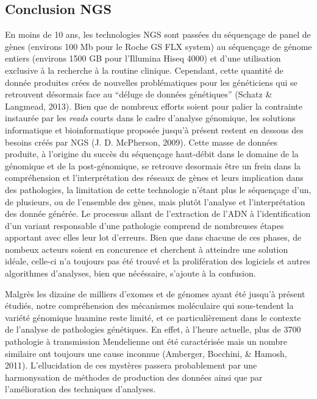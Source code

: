 \documentclass[12pt,twoside]{reedthesis}
\theoremstyle{definition}
\theoremstyle{definition}
\theoremstyle{remark}
\begin{document}
  \subsection{Conclusion NGS}\label{conclusion-ngs}
  
  En moins de 10 ans, les technologies NGS sont passées du séquençage de
  panel de gènes (environs 100 Mb pour le Roche GS FLX system) au
  séquençage de génome entiers (environs 1500 GB pour l'Illumina Hiseq
  4000) et d'une utilisation exclusive à la recherche à la routine
  clinique. Cependant, cette quantité de donnée produites crées de
  nouvelles problématiques pour les généticiens qui se retrouvent
  désormais face au ``déluge de données génétiques'' (Schatz \& Langmead,
  2013). Bien que de nombreux efforts soient pour palier la contrainte
  instaurée par les \emph{reads} courts dans le cadre d'analyse génomique,
  les solutions informatique et bioinformatique proposée jusqu'à présent
  restent en dessous des besoins créés par NGS (J. D. McPherson, 2009).
  Cette masse de données produite, à l'origine du succès du séquençage
  haut-débit dans le domaine de la génomique et de la post-génomique, se
  retrouve desormais être un frein dans la compréhension et
  l'interprétation des réseaux de gènes et leurs implication dans des
  pathologies, la limitation de cette technologie n'étant plus le
  séquençage d'un, de plusieurs, ou de l'ensemble des gènes, mais plutôt
  l'analyse et l'interprétation des donnée générée. Le processus allant de
  l'extraction de l'ADN à l'identification d'un variant responsable d'une
  pathologie comprend de nombreuses étapes apportant avec elles leur lot
  d'erreurs. Bien que dans chacune de ces phases, de nombeux acteurs
  soient en concurence et cherchent à atteindre une solution idéale,
  celle-ci n'a toujours pas été trouvé et la prolifération des logiciels
  et autres algorithmes d'analyses, bien que nécéssaire, s'ajoute à la
  confusion.
  
  Malgrès les dizaine de milliers d'exomes et de génomes ayant été jusqu'à
  présent étudiés, notre compréhension des mécanismes moléculaire qui
  sous-tendent la variété génomique huamine reste limité, et ce
  particulièrement dans le contexte de l'analyse de pathologies
  génétiques. En effet, à l'heure actuelle, plus de 3700 pathologie à
  transmission Mendelienne ont été caractérisée mais un nombre similaire
  ont toujours une cause inconnue (Amberger, Bocchini, \& Hamosh, 2011).
  L'ellucidation de ces mystères passera probablement par une
  harmonysation de méthodes de production des données ainsi que par
  l'amélioration des techniques d'analyses.
  
\end{document}
